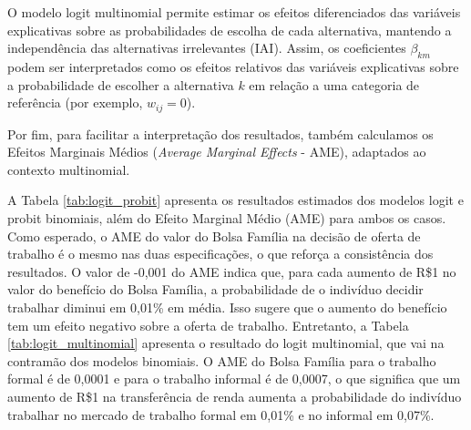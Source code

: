\documentclass[12pt]{article}
\theoremstyle{break}
\begin{document}
O modelo logit multinomial permite estimar os efeitos diferenciados das variáveis explicativas sobre as probabilidades de escolha de cada alternativa, mantendo a independência das alternativas irrelevantes (IAI). Assim, os coeficientes \(\beta_{km}\) podem ser interpretados como os efeitos relativos das variáveis explicativas sobre a probabilidade de escolher a alternativa \(k\) em relação a uma categoria de referência (por exemplo, \(w_{ij} = 0\)).

Por fim, para facilitar a interpretação dos resultados, também calculamos os Efeitos Marginais Médios (\textit{Average Marginal Effects} - AME), adaptados ao contexto multinomial.

A Tabela \ref{tab:logit_probit} apresenta os resultados estimados dos modelos logit e probit binomiais, além do Efeito Marginal Médio (AME) para ambos os casos. Como esperado, o AME do valor do Bolsa Família na decisão de oferta de trabalho é o mesmo nas duas especificações, o que reforça a consistência dos resultados. O valor de -0,001 do AME indica que, para cada aumento de R\$1 no valor do benefício do Bolsa Família, a probabilidade de o indivíduo decidir trabalhar diminui em 0,01\% em média. Isso sugere que o aumento do benefício tem um efeito negativo sobre a oferta de trabalho. Entretanto, a Tabela \ref{tab:logit_multinomial} apresenta o resultado do logit multinomial, que vai na contramão dos modelos binomiais. O AME do Bolsa Família para o trabalho formal é de 0,0001 e para o trabalho informal é de 0,0007, o que significa que um aumento de R\$1 na transferência de renda aumenta a probabilidade do indivíduo trabalhar no mercado de trabalho formal em 0,01\% e no informal em 0,07\%.
\end{document}
